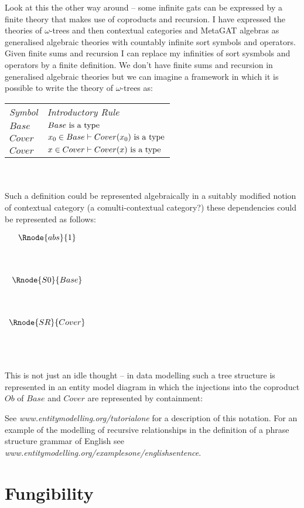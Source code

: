 \documentclass[10pt,a4paper]{article}
\theoremstyle{remark}
\begin{document}
Look at this the other way around -- some infinite gats can be expressed by a finite theory that makes use of coproducts and recursion.  I have expressed the theories of $\omega$-trees and then  contextual categories and MetaGAT algebras as generalised algebraic theories with countably infinite sort symbols and operators.  Given finite sums and recursion I can replace my infinities of sort sysmbols and operators  by a finite definition. 
We don't have finite sums and recursion  in generalised algebraic theories but we can imagine a framework in which it is possible to write
the theory of $\omega$-trees as: \\
\vspace{0.03cm} 
\begin{tabular}{>{\itshape}l l}
Symbol & \itshape{Introductory Rule} \\
$Base $     & $Base\mbox{ is a type}$\\
$Cover  $     & $x_0 \in Base    \vdash Cover(x_0)\mbox{ is a type} $\\
$Cover $      & $x \in Cover    \vdash Cover(x)\mbox{ is a type} $\\
\end{tabular} \\
\vspace{.1cm}  \\

Such a definition could be represented algebraically in a suitably modified notion of contextual category (a comulti-contextual category?) these dependencies could be represented
as follows:  

\begin{center}
$
\begin{array}{c c}
\Rnode{abs}{1}  \\ [1.4cm]
\Rnode{S0}{Base} \\ [1.4cm]
\Rnode{SR}{Cover} \\ [1.4cm]
\end{array}
$
\end{center}

\noindent This is not just an idle thought -- in  data modelling such a tree 
structure is represented in an entity model diagram in which the injections into the coproduct $Ob$ of $Base$ and $Cover$ are represented by containment: \\

\begin{center}

\end {center}
See \textit{www.entitymodelling.org/tutorialone} for a description of this notation.
For an example of the modelling of recursive relationships in the definition of a phrase structure grammar of English see 
\textit{www.entitymodelling.org/examplesone/englishsentence}.


\section{Fungibility} 




%

 

\end{document}
